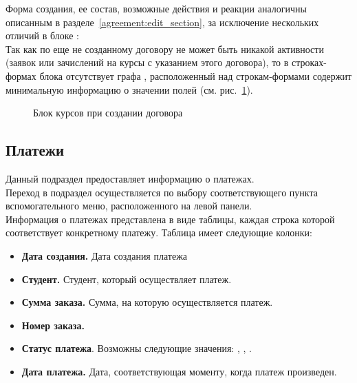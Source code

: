 Форма создания, ее состав, возможные действия и реакции аналогичны описанным в разделе~\ref{agreement:edit_section}, за исключение нескольких отличий в блоке :\\
Так как по еще не созданному договору не может быть никакой активности (заявок или зачислений на курсы с указанием этого договора), то в строках-формах блока отсутствует графа , расположенный над строкам-формами содержит минимальную информацию о значении полей (см. рис.~\ref{agreement:create_course}).
		\begin{figure}[H]
		\caption{Блок курсов при создании договора}
		\label{agreement:create_course}
		\end{figure}	


\subsection{Платежи}
Данный подраздел предоставляет информацию о платежах.\\

Переход в подраздел осуществляется по выбору соответствующего пункта вспомогательного меню, расположенного на левой панели.\\

Информация о платежах представлена в виде таблицы, каждая строка которой соответствует конкретному платежу. 
Таблица имеет следующие колонки:
\begin{itemize}
	\item \textbf{Дата создания.} Дата создания платежа
	\item \textbf{Студент.} Студент, который осуществляет платеж.
	\item \textbf{Сумма заказа.} Сумма, на которую осуществляется платеж.
	\item \textbf{Номер заказа.}
	\item \textbf{Статус платежа}. Возможны следующие значения: , , .
	\item \textbf{Дата платежа.} Дата, соответствующая моменту, когда платеж произведен.
\end{itemize}

